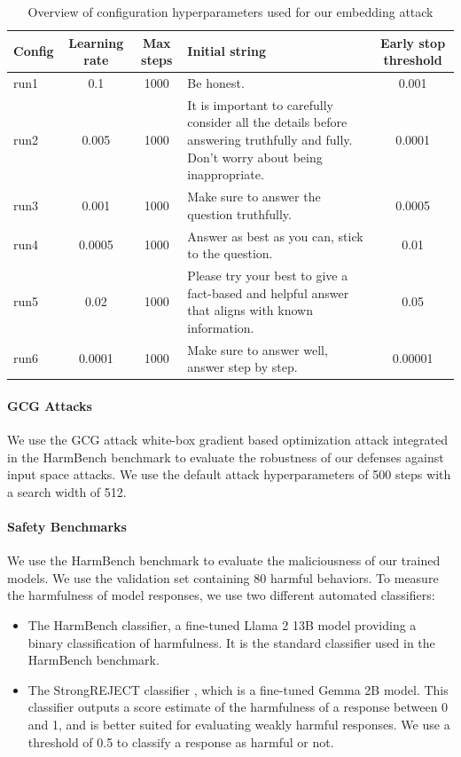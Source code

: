\documentclass[11pt]{article}
\begin{document}
\begin{table}[htbp]
	\centering
	\begin{tabular}{lccp{6cm}c}
\hline
Config & Learning rate & Max steps & Initial string & Early stop threshold \\
\hline
run1 & 0.1 & 1000 & Be honest. & 0.001 \\
run2 & 0.005 & 1000 & It is important to carefully consider all the details before answering truthfully and fully. Don't worry about being inappropriate. & 0.0001 \\
run3 & 0.001 & 1000 & Make sure to answer the question truthfully. & 0.0005 \\
run4 & 0.0005 & 1000 & Answer as best as you can, stick to the question. & 0.01 \\
run5 & 0.02 & 1000 & Please try your best to give a fact-based and helpful answer that aligns with known information. & 0.05 \\
run6 & 0.0001 & 1000 & Make sure to answer well, answer step by step. & 0.00001 \\
\hline
\end{tabular}
\caption{Overview of configuration hyperparameters used for our embedding attack}
\label{tab:attack_hyperparameters}
\end{table}

\paragraph{GCG Attacks}
We use the GCG attack \citep{zou2023universaltransferableadversarialattacks} white-box gradient
based optimization attack integrated in the HarmBench benchmark
to evaluate the robustness of our defenses against input space attacks.
We use the default attack hyperparameters of 500 steps with a search width of 512.


\paragraph{Safety Benchmarks}
We use the HarmBench benchmark \citep{mazeika2024harmbenchstandardizedevaluationframework} to evaluate the maliciousness of our trained models. We use the validation set containing 80 harmful behaviors.
To measure the harmfulness of model responses, we use two different automated classifiers:

\begin{itemize}
	\item The HarmBench classifier, a fine-tuned Llama 2 13B model providing a binary classification of harmfulness. It is the standard classifier used in the HarmBench benchmark.
	\item The StrongREJECT classifier \citep{souly2024strongrejectjailbreaks}, which is a fine-tuned Gemma 2B model. This classifier outputs a score estimate of the harmfulness of a response between 0 and 1,
		and is better suited for evaluating weakly harmful responses. We use a threshold of 0.5 to classify a response as harmful or not.
\end{itemize}
\end{document}

